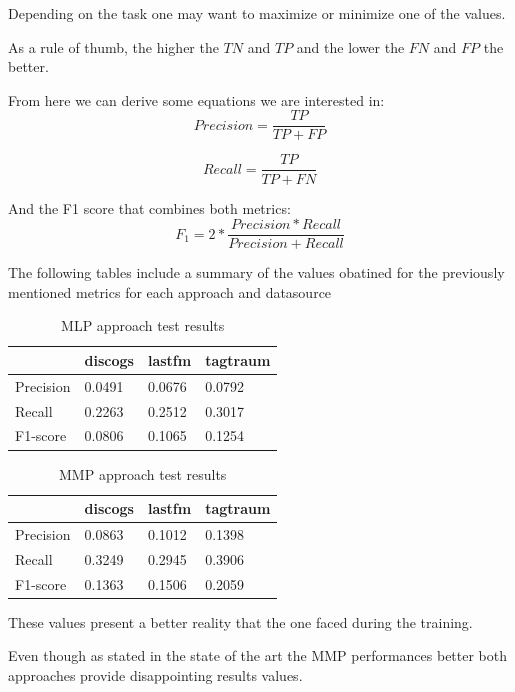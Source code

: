 Depending on the task one may want to maximize or minimize one of the values. 

As a rule of thumb, the higher the $TN$ and $TP$ and the lower the $FN$ and $FP$ the better.

From here we can derive some equations we are interested in:
$$ Precision = \frac{TP}{TP + FP} $$

$$ Recall = \frac{TP}{TP + FN} $$

And the F1 score that combines both metrics:
$$ F_1 = 2*\frac{Precision * Recall}{Precision + Recall} $$

The following tables include a summary of the values obatined for the previously mentioned metrics for each approach and datasource

\begin{table}[h!]
    \centering
    \begin{tabular}{l l l l} 
        \hline
         & discogs & lastfm & tagtraum \\ [0.5ex] 
        \hline
        Precision & 0.0491 & 0.0676 & 0.0792 \\ 
        Recall &  0.2263 &  0.2512 &  0.3017 \\
        F1-score &  0.0806 &  0.1065  & 0.1254 \\
        \hline
    \end{tabular}
    \caption{MLP approach test results}
    \label{table:MLP approach test results}
\end{table}


\begin{table}[h!]
    \centering
    \begin{tabular}{l l l l} 
        \hline
         & discogs & lastfm & tagtraum \\ [0.5ex] 
        \hline
        Precision & 0.0863 & 0.1012 & 0.1398 \\ 
        Recall &  0.3249 &  0.2945 &  0.3906 \\
        F1-score &  0.1363 &  0.1506  & 0.2059 \\
        \hline
    \end{tabular}
    \caption{MMP approach test results}
    \label{table:MMP approach test results}
\end{table}

These values present a better reality that the one faced during the training. 

Even though as stated in the state of the art the MMP performances better both approaches provide disappointing results values. 

